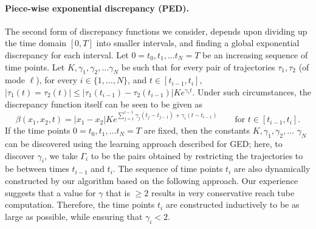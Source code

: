 \vspace{-10pt}
\paragraph{Piece-wise exponential discrepancy (PED).} 
The second form of discrepancy functions we consider, depends upon
dividing up the time domain $[0,T]$ into smaller intervals, and
finding a global exponential discrepancy for each interval. Let $0 =
t_0,t_1,\ldots t_N = T$ be an increasing sequence of time points. Let
$K, \gamma_1, \gamma_2, \ldots \gamma_N$ be such that for every pair
of trajectories $\tau_1,\tau_2$ (of mode $\ell$), for every $i \in
\{1,\ldots, N\}$, and $t \in [t_{i-1},t_i]$, $|\tau_1(t) = \tau_2(t)|
\leq |\tau_1(t_{i-1}) - \tau_2(t_{i-1})| Ke^{\gamma_i t}$.  Under such
circumstances, the discrepancy function itself can be seen to be given
as
\[
\beta(x_1,x_2,t) = |x_1 - x_2| Ke^{\sum_{j=1}^{i-1}\gamma_j(t_j -
  t_{j-1}) + \gamma_i (t-t_{i-1})} \qquad \mbox{for } t \in [t_{i-1},t_i].
\]
If the time points $0 = t_0,t_1,\ldots t_N = T$ are fixed, then the
constants $K, \gamma_1, \gamma_2, \ldots $ $\gamma_N$ can be discovered
using the learning approach described for GED; here, to discover $\gamma_i$, we take $\Gamma_i$ to be the pairs obtained by restricting the trajectories to be between times
$t_{i-1}$ and $t_i$. The sequence of time points $t_i$ are also
dynamically constructed by our algorithm based on the following
approach. Our experience suggests that a value for $\gamma$ that is
$\geq 2$ results in very conservative reach tube
computation. Therefore, the time points $t_i$ are constructed
inductively to be as large as possible, while ensuring that $\gamma_i <
2$.

